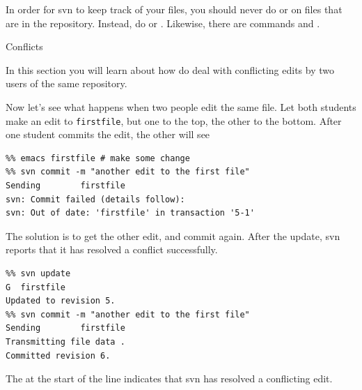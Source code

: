 

In order for svn to keep track of your files, you should never do
 or  on files that are in the repository. Instead, do
 or . Likewise, there are commands  and
.

 {Conflicts}

\begin{purpose}
  In this section you will learn about how do deal with conflicting
  edits by two users of the same repository.
\end{purpose}

Now let's see what happens when two people edit the same file.
Let both students make an edit to \verb+firstfile+, but one to the
top, the other to the bottom. After one student commits the edit, the
other will see
\begin{verbatim}
%% emacs firstfile # make some change
%% svn commit -m "another edit to the first file"
Sending        firstfile
svn: Commit failed (details follow):
svn: Out of date: 'firstfile' in transaction '5-1'
\end{verbatim}
The solution is to get the other edit, and commit again. After the
update, svn reports that it has resolved a conflict successfully.
\begin{verbatim}
%% svn update
G  firstfile
Updated to revision 5.
%% svn commit -m "another edit to the first file"
Sending        firstfile
Transmitting file data .
Committed revision 6.
\end{verbatim}
The  at the start of the line indicates that svn has resolved a
conflicting edit.

